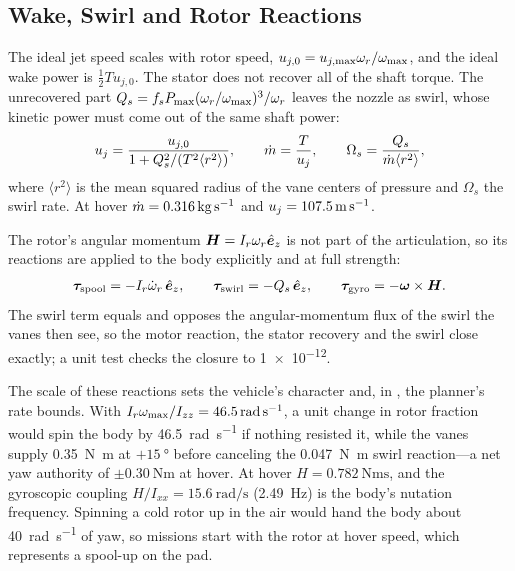 \documentclass[10pt,letterpaper]{article}
\begin{document}
\subsection{Wake, Swirl and Rotor Reactions}
\label{sec:reactions}

The ideal jet speed scales with rotor speed, $u_{j,0} = u_{j,\max}\omega_r/\omega_{\max}$, and the ideal wake power is $\tfrac12 T u_{j,0}$.
The stator does not recover all of the shaft torque.
The unrecovered part $Q_s = f_s P_{\max}(\omega_r/\omega_{\max})^3/\omega_r$ leaves the nozzle as swirl, whose kinetic power must come out of the same shaft power:
\begin{equation}
u_j = \frac{u_{j,0}}{1 + Q_s^2/(T^2\langle r^2\rangle)}, \qquad \dot{m} = \frac{T}{u_j}, \qquad \Omega_s = \frac{Q_s}{\dot{m}\langle r^2\rangle},
\label{eq:wake}
\end{equation}
where $\langle r^2\rangle$ is the mean squared radius of the vane centers of pressure and $\Omega_s$ the swirl rate.
At hover $\dot{m} = \SI{0.316}{\kilogram\per\second}$ and $u_j = \SI{107.5}{\metre\per\second}$.

The rotor's angular momentum $\bm{H} = I_r\omega_r\hat{\bm{e}}_z$ is not part of the articulation, so its reactions are applied to the body explicitly and at full strength:
\begin{equation}
\bm{\tau}_{\text{spool}} = -I_r\dot\omega_r\,\hat{\bm{e}}_z, \qquad
\bm{\tau}_{\text{swirl}} = -Q_s\,\hat{\bm{e}}_z, \qquad
\bm{\tau}_{\text{gyro}} = -\bm{\omega}\times\bm{H}.
\label{eq:reactions}
\end{equation}
The swirl term equals and opposes the angular-momentum flux of the swirl the vanes then see, so the motor reaction, the stator recovery and the swirl close exactly; a unit test checks the closure to \num{1e-12}.

The scale of these reactions sets the vehicle's character and, in , the planner's rate bounds.
With $I_r\omega_{\max}/I_{zz} = \SI{46.5}{\radian\per\second}$, a unit change in rotor fraction would spin the body by \SI{46.5}{\radian\per\second} if nothing resisted it, while the vanes supply \SI{0.35}{\newton\metre} at $+\SI{15}{\degree}$ before canceling the \SI{0.047}{\newton\metre} swirl reaction---a net yaw authority of $\pm\SI{0.30}{\newton\metre}$ at hover.
At hover $H = \SI{0.782}{\newton\metre\second}$, and the gyroscopic coupling $H/I_{xx} = \SI{15.6}{\radian\per\second}$ (\SI{2.49}{\hertz}) is the body's nutation frequency.
Spinning a cold rotor up in the air would hand the body about \SI{40}{\radian\per\second} of yaw, so missions start with the rotor at hover speed, which represents a spool-up on the pad.
\end{document}
